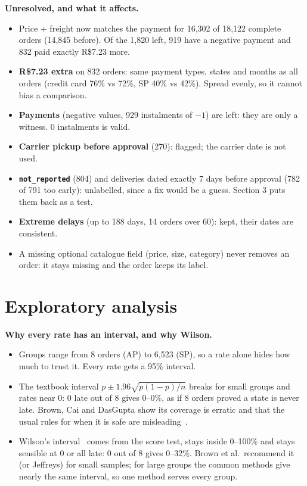 \documentclass[11pt,a4paper]{article}
\newcommand{\file}[1]{\texttt{#1}}
\begin{document}
\textbf{Unresolved, and what it affects.}
\begin{itemize}
  \item Price + freight now matches the payment for 16,302 of 18,122 complete orders (14,845 before). Of the 1,820 left, 919 have a negative payment and 832 paid exactly R\$7.23 more.
  \item \textbf{R\$7.23 extra} on 832 orders: same payment types, states and months as all orders (credit card 76\% vs 72\%, SP 40\% vs 42\%). Spread evenly, so it cannot bias a comparison.
  \item \textbf{Payments} (negative values, 929 instalments of $-1$) are left: they are only a witness. 0 instalments is valid.
  \item \textbf{Carrier pickup before approval} (270): flagged; the carrier date is not used.
  \item \textbf{\file{not\_reported}} (804) and deliveries dated exactly 7 days before approval (782 of 791 too early): unlabelled, since a fix would be a guess. Section 3 puts them back as a test.
  \item \textbf{Extreme delays} (up to 188 days, 14 orders over 60): kept, their dates are consistent.
  \item A missing optional catalogue field (price, size, category) never removes an order: it stays missing and the order keeps its label.
\end{itemize}

\section{Exploratory analysis}

\textbf{Why every rate has an interval, and why Wilson.}
\begin{itemize}
  \item Groups range from 8 orders (AP) to 6,523 (SP), so a rate alone hides how much to trust it. Every rate gets a 95\% interval.
  \item The textbook interval $p \pm 1.96\sqrt{p(1-p)/n}$ breaks for small groups and rates near 0: 0 late out of 8 gives 0--0\%, as if 8 orders proved a state is never late. Brown, Cai and DasGupta show its coverage is erratic and that the usual rules for when it is safe are misleading~\cite{brown}.
  \item Wilson's interval~\cite{wilson} comes from the score test, stays inside 0--100\% and stays sensible at 0 or all late: 0 out of 8 gives 0--32\%. Brown et al.\ recommend it (or Jeffreys) for small samples; for large groups the common methods give nearly the same interval, so one method serves every group.
\end{itemize}
\end{document}
